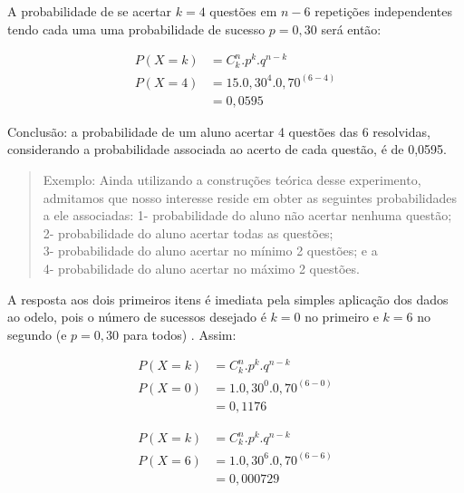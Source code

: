 \documentclass[
]{book}
\begin{document}
A probabilidade de se acertar \(k=4\) questões em \(n-6\) repetições independentes tendo cada uma uma probabilidade de sucesso \(p=0,30\) será então:

\hfill\break

\begin{align*}
P\left(X=k\right) & = {C}_{k}^{n}. {p}^{k}. {q}^{n-k} \\
P\left(X=4\right) & = 15 . 0,30^{4} . 0,70^{(6-4)} \\
 & = 0,0595
\end{align*}

\hfill\break

Conclusão: a probabilidade de um aluno acertar 4 questões das 6 resolvidas, considerando a probabilidade associada ao acerto de cada questão, é de 0,0595.

\hfill\break

\begin{quote}
Exemplo: Ainda utilizando a construções teórica desse experimento, admitamos que nosso interesse reside em obter as seguintes probabilidades a ele associadas:
1- probabilidade do aluno não acertar nenhuma questão;\\
2- probabilidade do aluno acertar todas as questões;\\
3- probabilidade do aluno acertar no mínimo 2 questões; e a\\
4- probabilidade do aluno acertar no máximo 2 questões.
\end{quote}

\hfill\break

A resposta aos dois primeiros itens é imediata pela simples aplicação dos dados ao odelo, pois o número de sucessos desejado é \(k=0\) no primeiro e \(k=6\) no segundo (e \(p=0,30\) para todos) . Assim:

\begin{align*}
P\left(X=k\right) & ={C}_{k}^{n}. {p}^{k}. {q}^{n-k} \\ 
P\left(X=0\right) & = 1 . 0,30^{0} . 0,70^{(6-0)} \\
                  & = 0,1176
\end{align*}

\hfill\break

\begin{align*}
P\left(X=k\right) & ={C}_{k}^{n}. {p}^{k}. {q}^{n-k} \\ 
P\left(X=6\right) & = 1 . 0,30^{6} . 0,70^{(6-6)} \\
                 & = 0,000729
\end{align*}
\end{document}
